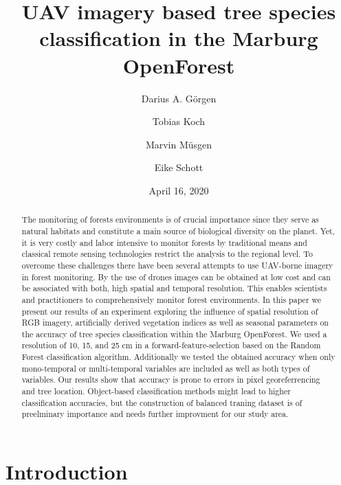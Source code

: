 \documentclass[]{article}
\title{UAV imagery based tree species classification in the Marburg OpenForest}
\author{Darius A. Görgen \and Tobias Koch \and Marvin Müsgen \and Eike Schott}
\date{April 16, 2020}
\begin{document}
\maketitle
\begin{abstract}
The monitoring of forests environments is of crucial importance since
they serve as natural habitats and constitute a main source of
biological diversity on the planet. Yet, it is very costly and labor
intensive to monitor forests by traditional means and classical remote
sensing technologies restrict the analysis to the regional level. To
overcome these challenges there have been several attempts to use
UAV-borne imagery in forest monitoring. By the use of drones images can
be obtained at low cost and can be associated with both, high spatial
and temporal resolution. This enables scientists and practitioners to
comprehensively monitor forest environments. In this paper we present
our results of an experiment exploring the influence of spatial
resolution of RGB imagery, artificially derived vegetation indices as
well as seasonal parameters on the accuracy of tree species
classification within the Marburg OpenForest. We used a resolution of
10, 15, and 25 cm in a forward-feature-selection based on the Random
Forest classification algorithm. Additionally we tested the obtained
accuracy when only mono-temporal or multi-temporal variables are
included as well as both types of variables. Our results show that
accuracy is prone to errors in pixel georeferrencing and tree location.
Object-based classification methods might lead to higher classification
accuracies, but the construction of balanced traning dataset is of
preelminary importance and needs further improvment for our study area.
\end{abstract}

{
\setcounter{tocdepth}{2}
\tableofcontents
}
\newpage

\hypertarget{introduction}{%
\section{Introduction}\label{introduction}}
\end{document}
